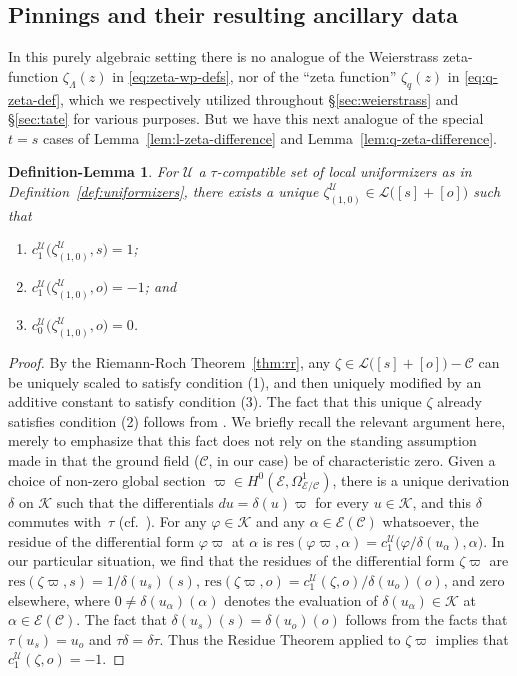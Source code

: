 \documentclass[preprint,12pt]{elsarticle}
\numberwithin{equation}{section} %
\theoremstyle{theorem}
\newtheorem{deflem}[theorem]{Definition-Lemma}
\theoremstyle{definition}
\newcommand{\Ca}{\mathcal{C}} %
\newcommand{\bk}{\mathcal{K}} %
\newcommand{\ec}{\mathcal{E}} %
\newcommand{\idec}{{o}} %
\newcommand{\zl}{\zeta_{\Lambda}}
\newcommand{\zq}{\zeta_{q}}
\newcommand{\za}[2]{\zeta^{\mathcal{U}}_{( {#1} , {#2} )}}
\begin{document}
\subsection{Pinnings and their resulting ancillary data}

In this purely algebraic setting there is no analogue of the Weierstrass zeta-function $\zl(z)$ in \eqref{eq:zeta-wp-defs}, nor of the ``zeta function'' $\zq(z)$ in \eqref{eq:q-zeta-def}, which we respectively utilized throughout \S\ref{sec:weierstrass} and \S\ref{sec:tate} for various purposes. But we have this next analogue of the special $t=s$ cases of Lemma~\ref{lem:l-zeta-difference} and Lemma~\ref{lem:q-zeta-difference}.

\begin{deflem}\label{deflem:a-zeta-difference} For $\mathcal{U}$ a $\tau$-compatible set of local uniformizers as in Definition~\ref{def:uniformizers}, there exists a unique $\za{1}{0} \in\mathcal{L}\bigl([s]+[\idec]\bigr)$ such that
\begin{enumerate}
    \item $c_1^\mathcal{U}\bigl(\za{1}{0},s\bigr)=1$;
    \item $c_1^\mathcal{U}\bigl(\za{1}{0},\idec\bigr)=-1$; and
    \item $c_0^\mathcal{U}\bigl(\za{1}{0},\idec\bigr)=0$.
\end{enumerate}
\end{deflem}

\begin{proof}
    By the Riemann-Roch Theorem~\ref{thm:rr}, any $\zeta\in\mathcal{L}\bigl([s]+[\idec]\bigr)-\Ca$ can be uniquely scaled to satisfy condition (1), and then uniquely modified by an additive constant to satisfy condition (3). The fact that this unique $\zeta$ already satisfies condition (2) follows from \cite[Lem.~B.15]{Dreyfus2018}. We briefly recall the relevant argument here, merely to emphasize that this fact does not rely on the standing assumption made in \cite[Appendix~B]{Dreyfus2018} that the ground field ($\Ca$, in our case) be of characteristic zero. Given a choice of non-zero global section $\varpi\in H^0(\ec,\Omega^1_{\ec/\Ca})$, there is a unique derivation $\delta$ on $\bk$ such that the differentials $du=\delta(u)\varpi$ for every $u\in\bk$, and this $\delta$ commutes with~$\tau$ (cf.~\cite[Prop.~III.5.1]{SilvermanIntro}). For any $\varphi\in\bk$ and any $\alpha\in\ec(\Ca)$ whatsoever, the residue of the differential form $\varphi\varpi$ at $\alpha$ is $\mathrm{res}(\varphi\varpi,\alpha)=c_1^\mathcal{U}\bigl(\varphi/\delta(u_\alpha),\alpha\bigr)$. In our particular situation, we find that the residues of the differential form $\zeta\varpi$ are $\mathrm{res}(\zeta\varpi,s)=1/\delta(u_s)(s)$, $\mathrm{res}(\zeta\varpi,\idec)=c_1^\mathcal{U}(\zeta,\idec)/\delta(u_\idec)(\idec)$, and zero elsewhere, where $0\neq\delta(u_\alpha)(\alpha)$ denotes the evaluation of $\delta(u_\alpha)\in\bk$ at $\alpha\in\ec(\Ca)$. The fact that $\delta(u_s)(s)=\delta(u_\idec)(\idec)$ follows from the facts that $\tau(u_s)=u_\idec$ and $\tau\delta=\delta\tau$. Thus the Residue Theorem \cite[Thm.~III.7.14.2]{Hartshorne} applied to $\zeta\varpi$ implies that $c_1^\mathcal{U}(\zeta,\idec)=-1$.
\end{proof}
\end{document}
